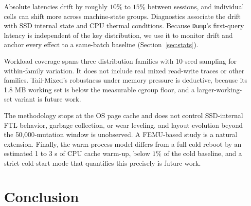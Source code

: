 \documentclass[sigconf, nonacm]{acmart}
\begin{document}
Absolute latencies drift by roughly $10\%$ to $15\%$ between sessions, and individual cells can shift more across machine-state groups. Diagnostics associate the drift with SSD internal state and CPU thermal conditions. Because \texttt{Dump}'s first-query latency is independent of the key distribution, we use it to monitor drift and anchor every effect to a same-batch baseline (Section~\ref{sec:stats}).

Workload coverage spans three distribution families with 10-seed sampling for within-family variation. It does not include real mixed read-write traces or other families. Tail-Mixed's robustness under memory pressure is deductive, because its 1.8 MB working set is below the measurable cgroup floor, and a larger-working-set variant is future work.

The methodology stops at the OS page cache and does not control SSD-internal FTL behavior, garbage collection, or wear leveling, and layout evolution beyond the 50,000-mutation window is unobserved. A FEMU-based study is a natural extension. Finally, the warm-process model differs from a full cold reboot by an estimated 1 to 3 \textmu s of CPU cache warm-up, below $1\%$ of the cold baseline, and a strict cold-start mode that quantifies this precisely is future work.

\section{Conclusion}\label{sec:conclusion}
\end{document}
